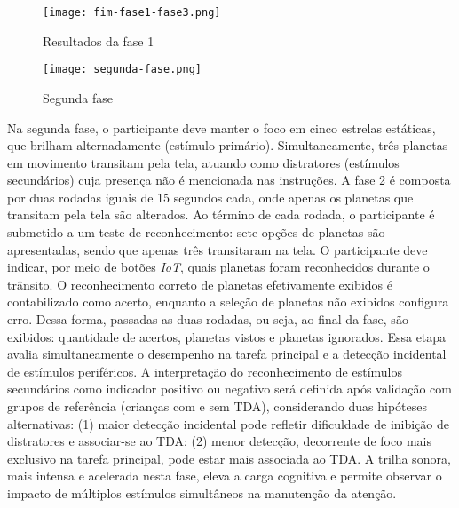 \begin{figure}[H]
    \centering
    \caption{Resultados da fase 1}%
    \label{fig:fim-fase1-fase3}
    \texttt{[image: fim-fase1-fase3.png]}%
\end{figure}

\begin{figure}[H]
    \centering
    \caption{Segunda fase}%
    \label{fig:segunda-fase}
    \texttt{[image: segunda-fase.png]}%
\end{figure}

Na segunda fase, o participante deve manter o foco em cinco estrelas estáticas, que brilham alternadamente (estímulo primário). Simultaneamente, três planetas em movimento transitam pela tela, atuando como distratores (estímulos secundários) cuja presença não é mencionada nas instruções. A fase 2 é composta por duas rodadas iguais de 15 segundos cada, onde apenas os planetas que transitam pela tela são alterados. Ao término de cada rodada, o participante é submetido a um teste de reconhecimento: sete opções de planetas são apresentadas, sendo que apenas três transitaram na tela. O participante deve indicar, por meio de botões \textit{IoT}, quais planetas foram reconhecidos durante o trânsito. O reconhecimento correto de planetas efetivamente exibidos é contabilizado como acerto, enquanto a seleção de planetas não exibidos configura erro. Dessa forma, passadas as duas rodadas, ou seja, ao final da fase, são exibidos: quantidade de acertos, planetas vistos e planetas ignorados. Essa etapa avalia simultaneamente o desempenho na tarefa principal e a detecção incidental de estímulos periféricos. A interpretação do reconhecimento de estímulos secundários como indicador positivo ou negativo será definida após validação com grupos de referência (crianças com e sem TDA), considerando duas hipóteses alternativas: (1) maior detecção incidental pode refletir dificuldade de inibição de distratores e associar-se ao TDA; (2) menor detecção, decorrente de foco mais exclusivo na tarefa principal, pode estar mais associada ao TDA. A trilha sonora, mais intensa e acelerada nesta fase, eleva a carga cognitiva e permite observar o impacto de múltiplos estímulos simultâneos na manutenção da atenção.

